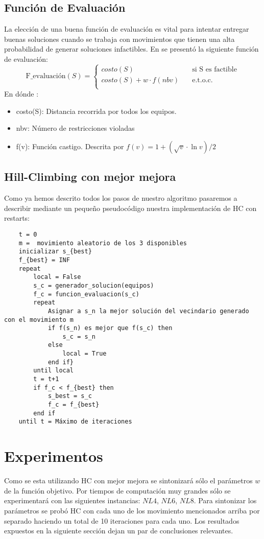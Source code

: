 \documentclass[letter, 10pt]{article}
\begin{document}
\subsection{Función de Evaluación}
    La elección de una buena función de evaluación es vital para intentar entregar buenas soluciones cuando se trabaja con movimientos que tienen una alta probabilidad de generar soluciones infactibles. En \cite{simulated} se presentó la siguiente función de evaluación:
    \[   
\text{F\_evaluación}(S) = 
     \begin{cases}
       costo(S) &\quad\text{si S es factible} \\
       costo(S) + w \cdot f(nbv) &\quad\text{e.t.o.c.}  \\
     \end{cases}
    \]
    En dónde :
    \begin{itemize}
        \item costo(S): Distancia recorrida por todos los equipos.
        \item nbv: Número de restricciones violadas
        \item f(v): Función castigo. Descrita por $f(v) = 1 + (\sqrt{v} \cdot \ln{v} )/2$
    \end{itemize}

\subsection{Hill-Climbing con mejor mejora}
    Como ya hemos descrito todos los pasos de nuestro algoritmo pasaremos a describir mediante un pequeño pseudocódigo nuestra implementación de HC con restarts:
\begin{lstlisting}
    t = 0
    m =  movimiento aleatorio de los 3 disponibles
    inicializar s_{best}
    f_{best} = INF
    repeat
        local = False
        s_c = generador_solucion(equipos)
        f_c = funcion_evaluacion(s_c)
        repeat
            Asignar a s_n la mejor solución del vecindario generado con el movimiento m
            if f(s_n) es mejor que f(s_c) then
                s_c = s_n
            else
                local = True
            end if}
        until local
        t = t+1
        if f_c < f_{best} then
            s_best = s_c
            f_c = f_{best}
        end if
    until t = Máximo de iteraciones
\end{lstlisting}

\section{Experimentos}
    Como se esta utilizando HC con mejor mejora se sintonizará sólo el parámetros $w$ de la función objetivo. Por tiempos de computación muy grandes sólo se experimentará con las siguientes instancias: $NL4$, $NL6$, $NL8$. Para sintonizar los parámetros se probó HC con cada uno de los movimiento mencionados arriba por separado haciendo un total de 10 iteraciones para cada uno. Los resultados expuestos en la siguiente sección dejan un par de conclusiones relevantes.    
\end{document}
